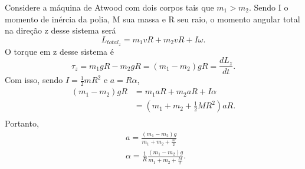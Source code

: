 \documentclass[physicsII_notes.tex]{subfiles}
\begin{document}
\begin{example}
	Considere a máquina de Atwood com dois corpos tais que \(m_{1} > m_{2}\). Sendo I o momento de inércia da polia, M sua massa e R seu raio, o momento angular total na direção z desse sistema será
	\[
		L_{total_z} = m_{1}vR + m_{2}vR + I\omega.
	\]
	O torque em z desse sistema é
	\[
		\tau_{z} = m_{1}gR - m_{2}gR = (m_{1}-m_{2})gR = \frac{dL_{z}}{dt}.
	\]
	Com isso, sendo \(I = \frac{1}{2}mR^{2}\) e \(a  = R\alpha \),
	\begin{align*}
		(m_{1}-m_{2})gR & = m_{1}aR + m_{2}aR + I\alpha        \\
		                & = (m_{1}+m_{2}+\frac{1}{2}MR^{2})aR. \\
	\end{align*}
	Portanto,
	\begin{align*}
		 & a = \frac{(m_{1}-m_{2})g}{m_{1}+m_{2}+\frac{M}{2}}                   \\
		 & \alpha = \frac{1}{R}\frac{(m_{1}-m_{2})g}{m_{1}+m_{2}+\frac{M}{2}}.\
	\end{align*}
\end{example}
\end{document}
